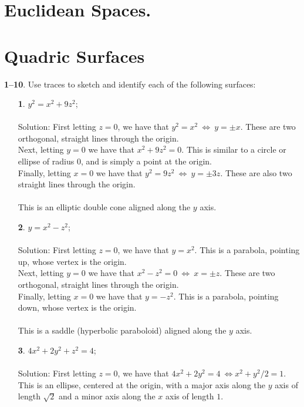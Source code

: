 \documentclass[12pt]{amsbook}
\begin{document}
\newpage
\section{Euclidean Spaces.}

\newpage

\section{Quadric Surfaces}


\noindent
{\small\bf 1--10}. Use traces to sketch and identify each of the following
surfaces:\begin{enumerate} 
\item[{\small\bf 1}.]\quad $y^2=x^2+9z^2$;
\\
\\
{\sc Solution}: First letting $z=0$, we have that $y^2=x^2 \ \Leftrightarrow \ y=\pm x$. These are two orthogonal, straight lines through the origin. 
\\
Next, letting $y=0$ we have that $x^2+9z^2=0$. This is similar to a circle or ellipse of radius $0$, and is simply a point at the origin. 
\\
Finally, letting $x=0$ we have that $y^2=9z^2 \ \Leftrightarrow \ y=\pm 3z$. These are also two straight lines through the origin.
\\
\\
This is an elliptic double cone aligned along the $y$ axis. 
\\
\item[{\small\bf 2}.]\quad  $y=x^2-z^2$; 
\\
\\
{\sc Solution}: First letting $z=0$, we have that $y=x^2$. This is a parabola, pointing up, whose vertex is the origin.
\\
Next, letting $y=0$ we have that $x^2-z^2=0 \ \Leftrightarrow \ x=\pm z$. These are two orthogonal, straight lines through the origin.
\\
Finally, letting $x=0$ we have that $y=-z^2$. This is a parabola, pointing down, whose vertex is the origin.
\\
\\
This is a saddle (hyperbolic paraboloid) aligned along the $y$ axis. 
\\
\item[{\small\bf 3}.]\quad 
$4x^2+2y^2+z^2=4$;
\\
\\
{\sc Solution}: First letting $z=0$, we have that $4x^2+2y^2=4 \ \Leftrightarrow x^2+y^2/2=1$. This is an ellipse, centered at the origin, with a major axis along the $y$ axis of length $\sqrt{2}$ and a minor axis along the $x$ axis of length $1$.

\end{enumerate}
\end{document}
